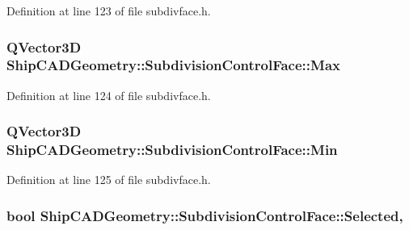 Definition at line 123 of file subdivface.\-h.

\hypertarget{classShipCADGeometry_1_1SubdivisionControlFace_adb25745071d7a1f7b703c31f8518af41}{
\subsubsection[{Max}]{\setlength{\rightskip}{0pt plus 5cm}Q\-Vector3\-D Ship\-C\-A\-D\-Geometry\-::\-Subdivision\-Control\-Face\-::\-Max\hspace{0.3cm}{\ttfamily [read]}}}\label{classShipCADGeometry_1_1SubdivisionControlFace_adb25745071d7a1f7b703c31f8518af41}


Definition at line 124 of file subdivface.\-h.

\hypertarget{classShipCADGeometry_1_1SubdivisionControlFace_a34f00f0c4a50ea9124173c67041d9746}{
\subsubsection[{Min}]{\setlength{\rightskip}{0pt plus 5cm}Q\-Vector3\-D Ship\-C\-A\-D\-Geometry\-::\-Subdivision\-Control\-Face\-::\-Min\hspace{0.3cm}{\ttfamily [read]}}}\label{classShipCADGeometry_1_1SubdivisionControlFace_a34f00f0c4a50ea9124173c67041d9746}


Definition at line 125 of file subdivface.\-h.

\hypertarget{classShipCADGeometry_1_1SubdivisionControlFace_a61b316c367087520d43506a86be7caf5}{
\subsubsection[{Selected}]{\setlength{\rightskip}{0pt plus 5cm}bool Ship\-C\-A\-D\-Geometry\-::\-Subdivision\-Control\-Face\-::\-Selected\hspace{0.3cm}{\ttfamily [read]}, {\ttfamily [write]}}}\label{classShipCADGeometry_1_1SubdivisionControlFace_a61b316c367087520d43506a86be7caf5}


